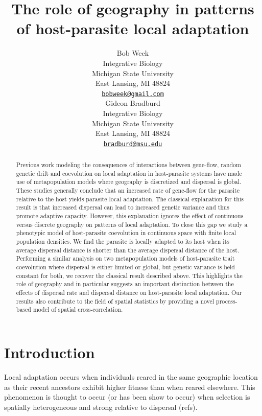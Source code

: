\documentclass{article}
\title{The role of geography in patterns of host-parasite local
adaptation}
\author{
    Bob Week
   \\
    Integrative Biology \\
    Michigan State University \\
  East Lansing, MI 48824 \\
  \texttt{\href{mailto:bobweek@gmail.com}{\nolinkurl{bobweek@gmail.com}}} \\
   \And
    Gideon Bradburd
   \\
    Integrative Biology \\
    Michigan State University \\
  East Lansing, MI 48824 \\
  \texttt{\href{mailto:bradburd@msu.edu}{\nolinkurl{bradburd@msu.edu}}} \\
  }
\begin{document}
\maketitle

\def\tightlist{}


\begin{abstract}
Previous work modeling the consequences of interactions between
gene-flow, random genetic drift and coevolution on local adaptation in
host-parasite systems have made use of metapopulation models where
geography is discretized and dispersal is global. These studies
generally conclude that an increased rate of gene-flow for the parasite
relative to the host yields parasite local adaptation. The classical
explanation for this result is that increased dispersal can lead to
increased genetic variance and thus promote adaptive capacity. However,
this explanation ignores the effect of continuous versus discrete
geography on patterns of local adaptation. To close this gap we study a
phenotypic model of host-parasite coevolution in continuous space with
finite local population densities. We find the parasite is locally
adapted to its host when its average dispersal distance is shorter than
the average dispersal distance of the host. Performing a similar
analysis on two metapopulation models of host-parasite trait coevolution
where dispersal is either limited or global, but genetic variance is
held constant for both, we recover the classical result described above.
This highlights the role of geography and in particular suggests an
important distinction between the effects of dispersal rate and
dispersal distance on host-parasite local adaptation. Our results also
contribute to the field of spatial statistics by providing a novel
process-based model of spatial cross-correlation.
\end{abstract}


\hypertarget{introduction}{%
\section{Introduction}\label{introduction}}

Local adaptation occurs when individuals reared in the same geographic
location as their recent ancestors exhibit higher fitness than when
reared elsewhere. This phenomenon is thought to occur (or has been show
to occur) when selection is spatially heterogeneous and strong relative
to dispersal (refs).
\end{document}
